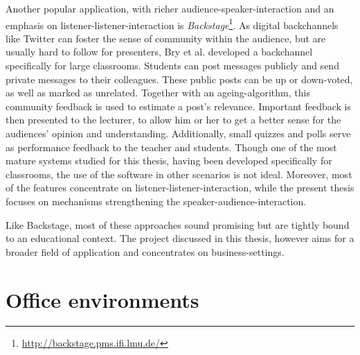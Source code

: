 Another popular application, with richer audience-spea\-ker-in\-ter\-ac\-tion and an emphasis on listener-listener-interaction is \emph{Backstage}\footnote{\url{http://backstage.pms.ifi.lmu.de/}}. As digital backchannels like Twitter can foster the sense of community within the audience, but are usually hard to follow for presenters, Bry et al.\cite{Bry:Backstage} developed a backchannel specifically for large classrooms. Students can post messages publicly and send private messages to their colleagues. These public posts can be up or down-voted, as well as marked as unrelated. Together with an ageing-algorithm, this community feedback is used to estimate a post's relevance. Important feedback is then presented to the lecturer, to allow him or her to get a better sense for the audiences' opinion and understanding. Additionally, small quizzes and polls serve as performance feedback to the teacher and students. Though one of the most mature systems studied for this thesis, having been developed specifically for classrooms, the use of the software in other scenarios is not ideal. Moreover, most of the features concentrate on listener-listener-interaction, while the present thesis focuses on mechanisms strengthening the speaker-audience-interaction.

Like Backstage, most of these approaches sound promising but are tightly bound to an educational context. The project discussed in this thesis, however aims for a broader field of application and concentrates on business-settings.

\section{Office environments}

